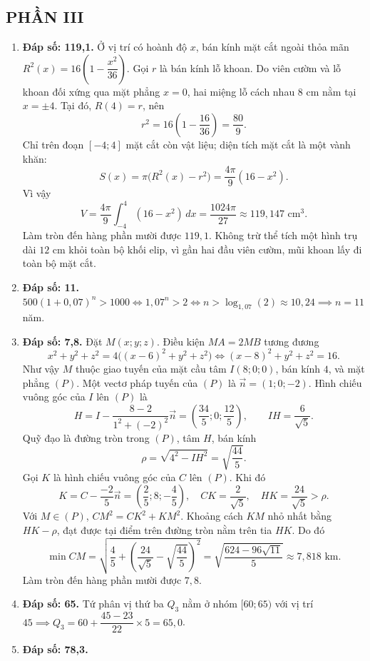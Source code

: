 \documentclass[12pt,a4paper]{article}
\begin{document}
\subsection*{PHẦN III}
\begin{enumerate}[label=\textbf{Câu \arabic*:}, leftmargin=*]
\item \textbf{Đáp số: 119,1.}
Ở vị trí có hoành độ $x$, bán kính mặt cắt ngoài thỏa mãn $R^2(x)=16\left(1-\dfrac{x^2}{36}\right)$.
Gọi $r$ là bán kính lỗ khoan. Do viên cườm và lỗ khoan đối xứng qua mặt phẳng $x=0$, hai miệng lỗ cách nhau $8\text{ cm}$ nằm tại $x=\pm4$. Tại đó, $R(4)=r$, nên
\[
 r^2=16\left(1-\frac{16}{36}\right)=\frac{80}{9}.
\]
Chỉ trên đoạn $[-4;4]$ mặt cắt còn vật liệu; diện tích mặt cắt là một vành khăn:
\[
 S(x)=\pi\bigl(R^2(x)-r^2\bigr)=\frac{4\pi}{9}(16-x^2).
\]
Vì vậy
\[
 V=\frac{4\pi}{9}\int_{-4}^{4}(16-x^2)\,dx
   =\frac{1024\pi}{27}\approx119{,}147\text{ cm}^3.
\]
Làm tròn đến hàng phần mười được $119{,}1$. Không trừ thể tích một hình trụ dài $12\text{ cm}$ khỏi toàn bộ khối elip, vì gần hai đầu viên cườm, mũi khoan lấy đi toàn bộ mặt cắt.
\item \textbf{Đáp số: 11.} $500(1 + 0{,}07)^n > 1000 \iff 1{,}07^n > 2 \iff n > \log_{1{,}07}(2) \approx 10{,}24 \implies n = 11$ năm.
\item \textbf{Đáp số: 7,8.}
Đặt $M(x;y;z)$. Điều kiện $MA=2MB$ tương đương
\[
 x^2+y^2+z^2=4\bigl((x-6)^2+y^2+z^2\bigr)
 \iff (x-8)^2+y^2+z^2=16.
\]
Như vậy $M$ thuộc giao tuyến của mặt cầu tâm $I(8;0;0)$, bán kính $4$, và mặt phẳng $(P)$. Một vectơ pháp tuyến của $(P)$ là $\vec n=(1;0;-2)$.
Hình chiếu vuông góc của $I$ lên $(P)$ là
\[
 H=I-\frac{8-2}{1^2+(-2)^2}\vec n
   =\left(\frac{34}{5};0;\frac{12}{5}\right),
 \qquad IH=\frac6{\sqrt5}.
\]
Quỹ đạo là đường tròn trong $(P)$, tâm $H$, bán kính
\[
 \rho=\sqrt{4^2-IH^2}=\sqrt{\frac{44}{5}}.
\]
Gọi $K$ là hình chiếu vuông góc của $C$ lên $(P)$. Khi đó
\[
 K=C-\frac{-2}{5}\vec n=\left(\frac25;8;-\frac45\right),
 \quad CK=\frac2{\sqrt5},\quad HK=\frac{24}{\sqrt5}>\rho.
\]
Với $M\in(P)$, $CM^2=CK^2+KM^2$. Khoảng cách $KM$ nhỏ nhất bằng $HK-\rho$, đạt được tại điểm trên đường tròn nằm trên tia $HK$. Do đó
\[
 \min CM=\sqrt{\frac45+\left(\frac{24}{\sqrt5}-\sqrt{\frac{44}{5}}\right)^2}
 =\sqrt{\frac{624-96\sqrt{11}}5}\approx7{,}818\text{ km}.
\]
Làm tròn đến hàng phần mười được $7{,}8$.
\item \textbf{Đáp số: 65.} Tứ phân vị thứ ba $Q_3$ nằm ở nhóm $[60; 65)$ với vị trí $45 \implies Q_3 = 60 + \dfrac{45 - 23}{22} \times 5 = 65{,}0$.
\item \textbf{Đáp số: 78,3.}

\end{enumerate}
\end{document}
